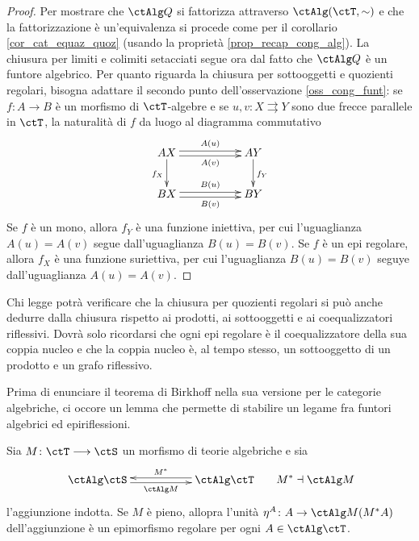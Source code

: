 \begin{proof}
 Per mostrare che \(\ctAlg Q\) si fattorizza attraverso \(\ctAlg(\ctT,\sim)\) e che la fattorizzazione è un'equivalenza si procede
 come per il corollario \ref{cor_cat_equaz_quoz} (usando la proprietà \ref{prop_recap_cong_alg}). La chiusura per limiti e
 colimiti setacciati segue ora dal fatto che \(\ctAlg Q\) è un funtore algebrico. Per quanto riguarda la chiusura per sottooggetti
 e quozienti regolari, bisogna adattare il secondo punto dell'osservazione \ref{oss_cong_funt}: se
 \(f \colon A \to B\) è un morfismo di \(\ctT\)-algebre e se \(u,v \colon X \rightrightarrows Y\) sono due frecce parallele in
 \(\ctT\), la naturalità di \(f\) da luogo al diagramma commutativo
 \[\xymatrix{AX \ar@<-0.5ex>[rr]_-{A(v)} \ar@<0.5ex>[rr]^-{A(u)} \ar[d]_{f_X} & & AY \ar[d]^{f_Y} \\
  BX \ar@<-0.5ex>[rr]_-{B(v)} \ar@<0.5ex>[rr]^-{B(u)} & & BY }\]
 Se \(f\) è un mono, allora \(f_Y\) è una funzione iniettiva, per cui l'uguaglianza \(A(u)=A(v)\) segue dall'uguaglianza \(B(u)=B(v)\).
 Se \(f\) è un epi regolare, allora \(f_X\) è una funzione suriettiva, per cui l'uguaglianza \(B(u)=B(v)\) seguye dall'uguaglianza \(A(u)=A(v)\).
\end{proof}

\begin{exercise}\label{esercizio_quozreg_colimset}
 Chi legge potrà verificare che la chiusura per quozienti regolari si può anche dedurre dalla chiusura rispetto ai prodotti,
 ai sottooggetti e ai coequalizzatori riflessivi. Dovrà solo ricordarsi che ogni epi regolare è il coequalizzatore della sua
 coppia nucleo e che la coppia nucleo è, al tempo stesso, un sottooggetto di un prodotto e un grafo riflessivo.
\end{exercise}

Prima di enunciare  il teorema di Birkhoff nella sua versione per le categorie algebriche, ci occore un lemma che
permette di stabilire un legame fra funtori algebrici ed epiriflessioni.

\begin{lemma}\label{lemma_unita_agg_alg}
 Sia \(M \colon \ctT \fun \ctS\) un morfismo di teorie algebriche e sia
 \[\xymatrix{ \ctAlg\ctS \ar@<-0.5ex>[rr]_-{\ctAlg M} & & \ctAlg \ctT \ar@<-0.5ex>[ll]_-{M^*} } \;\;\;\;\;\; M^* \dashv \ctAlg M\]
 l'aggiunzione indotta. Se \(M\) è pieno, allopra l'unità \(\eta^A \colon A \to \ctAlg M(M^*A)\) dell'aggiunzione è un
 epimorfismo regolare per ogni \(A \in \ctAlg\ctT\).
\end{lemma}

